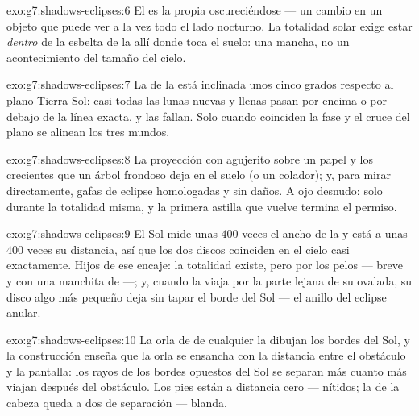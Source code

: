 \begin{solution}{exo:g7:shadows-eclipses:6}
El  es la propia  oscureciéndose --- un
cambio en un objeto que puede ver a la vez todo el lado nocturno. La
totalidad solar exige estar \emph{dentro} de la esbelta  de
la  allí donde toca el suelo: una mancha, no un acontecimiento
del tamaño del cielo.
\end{solution}

\begin{solution}{exo:g7:shadows-eclipses:7}
La  de la  está inclinada unos cinco grados respecto
al plano Tierra-Sol: casi todas las lunas nuevas y
llenas pasan por encima o por debajo de la línea exacta, y las
 fallan. Solo cuando coinciden la fase y el cruce del plano
se alinean los tres mundos.
\end{solution}

\begin{solution}{exo:g7:shadows-eclipses:8}
La proyección con agujerito sobre un papel y los crecientes que un
árbol frondoso deja en el suelo (o un colador); y, para mirar
directamente, gafas de eclipse homologadas y sin daños. A ojo desnudo:
solo durante la totalidad misma, y la primera astilla que vuelve
termina el permiso.
\end{solution}

\begin{solution}{exo:g7:shadows-eclipses:9}
El Sol mide unas $400$ veces el ancho de la  y está a unas
$400$ veces su distancia, así que los dos discos coinciden en el cielo
casi exactamente. Hijos de ese encaje: la totalidad existe, pero por
los pelos --- breve y con una manchita de  ---; y, cuando la
 viaja por la parte lejana de su  ovalada, su disco
algo más pequeño deja sin tapar el borde del Sol --- el anillo del
eclipse anular.
\end{solution}

\begin{solution}{exo:g7:shadows-eclipses:10}
La orla de  de cualquier  la dibujan los bordes del
Sol, y la construcción enseña que la orla se ensancha con la distancia
entre el obstáculo y la pantalla: los rayos de los bordes opuestos del
Sol se separan más cuanto más viajan después del obstáculo. Los pies
están a distancia cero --- nítidos; la  de la cabeza queda a
dos  de separación --- blanda.
\end{solution}

